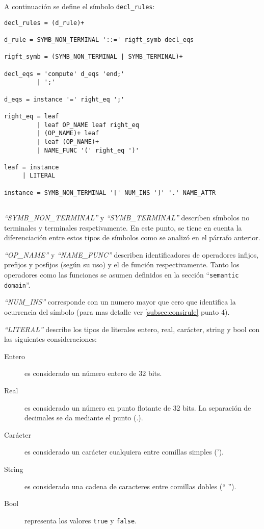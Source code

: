 A continuación se define el símbolo \texttt{decl\_rules}:

\begin{lstlisting}[frame=shadowbox, rulesepcolor=\color{blue}, language=inform]
decl_rules = (d_rule)+ 

d_rule = SYMB_NON_TERMINAL '::=' rigft_symb decl_eqs

rigft_symb = (SYMB_NON_TERMINAL | SYMB_TERMINAL)+

decl_eqs = 'compute' d_eqs 'end;'
         | ';'

d_eqs = instance '=' right_eq ';'

right_eq = leaf
         | leaf OP_NAME leaf right_eq
         | (OP_NAME)+ leaf
         | leaf (OP_NAME)+
         | NAME_FUNC '(' right_eq ')' 

leaf = instance
     | LITERAL

instance = SYMB_NON_TERMINAL '[' NUM_INS ']' '.' NAME_ATTR
            
\end{lstlisting}

\textit{``SYMB\_NON\_TERMINAL''} y \textit{``SYMB\_TERMINAL''} describen símbolos no terminales y terminales respetivamente. En este punto, se tiene en cuenta la diferenciación entre estos tipos de símbolos como se analizó en el párrafo anterior.
 
\textit{``OP\_NAME''} y  \textit{``NAME\_FUNC''} describen identificadores de operadores infijos, prefijos y posfijos (según su uso) y el de función respectivamente. Tanto los operadores como las funciones se asumen definidos en la sección ``\texttt{semantic domain}''.

\textit{``NUM\_INS''} corresponde con un numero mayor que cero que identifica la ocurrencia del símbolo (para mas detalle ver \ref{subsec:consirule} punto 4).

\textit{``LITERAL''} describe los tipos de literales entero, real, carácter, string y bool con las siguientes consideraciones:

\begin{description}
\item [Entero] es considerado un número entero de 32 bits. 
\item [Real] es considerado un número en punto flotante de 32 bits. La separación de decimales se da mediante el punto (.).
\item [Carácter] es considerado un carácter cualquiera entre comillas simples (').
\item [String] es considerado una cadena de caracteres entre comillas dobles (`` '').
\item [Bool] representa los valores \texttt{true} y \texttt{false}.
\end{description}

